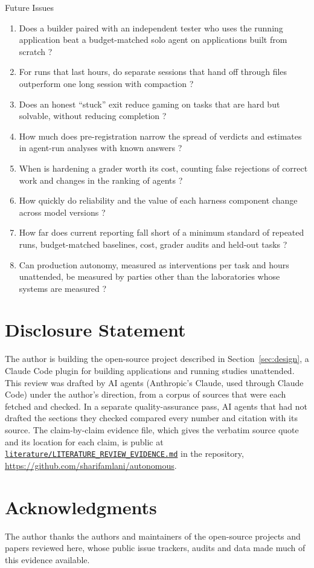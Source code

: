 \begin{arbox}{Future Issues}
\begin{enumerate}[leftmargin=*,itemsep=2pt]
\item Does a builder paired with an independent tester who uses the running application beat a budget-matched solo agent on applications built from scratch \citep{T12,T28}?
\item For runs that last hours, do separate sessions that hand off through files outperform one long session with compaction \citep{F3,T22}?
\item Does an honest ``stuck'' exit reduce gaming on tasks that are hard but solvable, without reducing completion \citep{V3}?
\item How much does pre-registration narrow the spread of verdicts and estimates in agent-run analyses with known answers \citep{R1,R6}?
\item When is hardening a grader worth its cost, counting false rejections of correct work and changes in the ranking of agents \citep{V27,T24}?
\item How quickly do reliability and the value of each harness component change across model versions \citep{H20,F2}?
\item How far does current reporting fall short of a minimum standard of repeated runs, budget-matched baselines, cost, grader audits and held-out tasks \citep{A10}?
\item Can production autonomy, measured as interventions per task and hours unattended, be measured by parties other than the laboratories whose systems are measured \citep{F14,F30,F32}?
\end{enumerate}
\end{arbox}

\section*{Disclosure Statement}

The author is building the open-source project described in Section~\ref{sec:design}, a Claude Code plugin for building applications and running studies unattended. This review was drafted by AI agents (Anthropic's Claude, used through Claude Code) under the author's direction, from a corpus of sources that were each fetched and checked. In a separate quality-assurance pass, AI agents that had not drafted the sections they checked compared every number and citation with its source. The claim-by-claim evidence file, which gives the verbatim source quote and its location for each claim, is public at \href{https://github.com/sharifamlani/autonomous/blob/main/literature/LITERATURE_REVIEW_EVIDENCE.md}{\texttt{literature/LITERATURE\_REVIEW\_EVIDENCE.md}} in the repository, \url{https://github.com/sharifamlani/autonomous}.

\section*{Acknowledgments}

The author thanks the authors and maintainers of the open-source projects and papers reviewed here, whose public issue trackers, audits and data made much of this evidence available.
